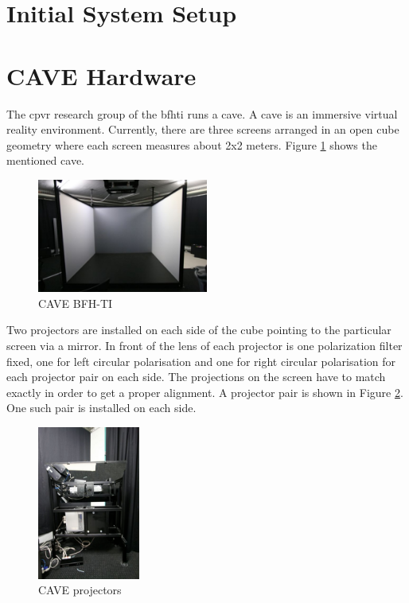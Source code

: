 
\section{Initial System Setup}

\section{CAVE Hardware}
\label{sec:cave_hardware}
The \gls{cpvr} research group of the \gls{bfhti} runs a \gls{cave}. A \gls{cave} is an immersive virtual reality environment. Currently, there are three screens arranged in an open cube geometry where each screen measures about 2x2 meters. Figure \ref{fig:cave} shows the mentioned \gls{cave}.
\begin{figure}[H]
	\centering
	\includegraphics[width=0.5\textwidth]{../figures/fotos/emptyCave}
	\caption{CAVE BFH-TI}
	\label{fig:cave}
\end{figure}

Two projectors are installed on each side of the cube pointing to the particular screen via a mirror. In front of the lens of each projector is one polarization filter fixed, one for left circular polarisation and one for right circular polarisation for each projector pair on each side. The projections on the screen have to match exactly in order to get a proper alignment. A projector pair is shown in Figure \ref{fig:projectors}. One such pair is installed on each side.

\begin{figure}[H]
	\centering
	\includegraphics[width=0.3\textwidth]{../figures/fotos/projectors}
	\caption{CAVE projectors}
	\label{fig:projectors}
\end{figure}

